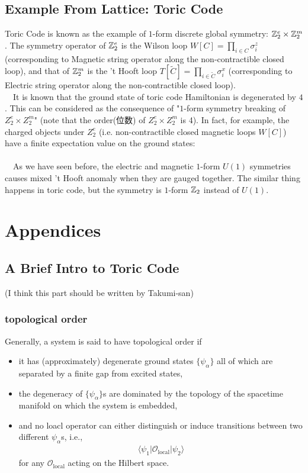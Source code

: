 \documentclass{ltjsarticle}
\theoremstyle{mystyle} %
\numberwithin{equation}{section}
\begin{document}
\subsection{Example From Lattice: Toric Code}
Toric Code is known as the example of $1$-form 
discrete global symmetry: $\mathbb{Z}^{e}_2\times \mathbb{Z}^m_2$. 
The symmetry operator of $\mathbb{Z}^e_2$ is the Wilson loop 
$W[C]=\prod_{i\in C}\sigma^z_i$
 (corresponding to Magnetic string operator along the non-contractible closed loop), 
and that of $\mathbb{Z}^m_2$ is the 't Hooft loop 
$T[\tilde{C}]=\prod_{i\in \tilde{C}}\sigma^x_i$
(corresponding to Electric string operator along the non-contractible closed loop). \\
　It is known that the ground state of toric code Hamiltonian is degenerated by $4$. 
This can be considered as the consequence of 
"$1$-form symmetry breaking of $Z^e_2\times Z^m_2$" 
(note that the order(位数) of $Z^e_2\times Z^m_2$ is 4). 
In fact, for example, the charged objects under $Z^e_2$ 
(i.e. non-contractible closed magnetic loops $W[C]$) 
have a finite expectation value on the ground states: 
\\
\\
　As we have seen before, the electric and magnetic $1$-form $U(1)$ symmetries causes
mixed 't Hooft anomaly when they are gauged together. 
The similar thing happens in toric code, but the symmetry is $1$-form $\mathbb{Z}_2$ instead of $U(1)$. 

\section{Appendices}
\subsection{A Brief Intro to Toric Code}
\noindent
\tiny
(I think this part should be written by Takumi-san)\\
\normalsize
\subsubsection{topological order}
Generally, a system is said to have topological order if
\cite{DXN}
\begin{itemize}
    \item it has (approximately) degenerate ground states $\{\psi_\alpha\}$ 
    all of which are separated by a finite gap from excited states, 
    \item the degeneracy of $\{\psi_\alpha\}$s are dominated by the topology of the spacetime manifold 
    on which the system is embedded, 
    \item and no loacl operator can either distinguish or induce transitions between two different $\psi_\alpha$s, i.e., 
    \begin{align}
        \langle \psi_1 |\mathcal{O}_{\mathrm{local}} |\psi_2\rangle
    \end{align}
    for any $\mathcal{O}_{\mathrm{local}}$ acting on the Hilbert space. 
\end{itemize}
\end{document}
